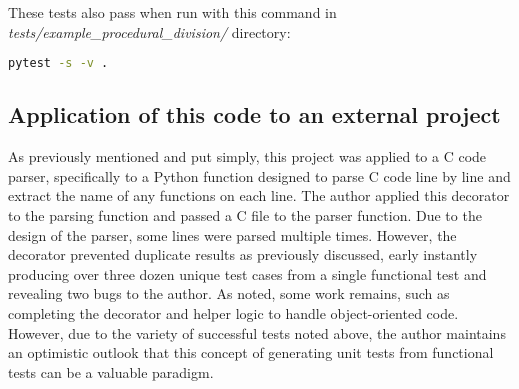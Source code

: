 These tests also pass when run with this command in 
\linebreak
\textit{tests/example\_procedural\_division/} directory:
\begin{lstlisting}[language=bash, caption={Running all generated unit
   tests for the division example}]
    pytest -s -v .
\end{lstlisting}

\subsection{Application of this code to an external project}\label{sec:eval-2}
As previously mentioned and put simply, this project was applied to a C code parser, 
specifically to a Python function designed to parse C code line by line
and extract the name of any functions on each line.  The author applied this
decorator to the parsing function and passed a C file to the parser function.
%
Due to the design of the parser, some lines were parsed multiple times.  
However, the decorator prevented duplicate results as previously discussed, 
early instantly producing over three dozen unique test cases 
from a single functional test and revealing two bugs to the author.
%
As noted, some work remains, such as completing the decorator and helper logic
to handle object-oriented code.  However, due to the variety of successful 
tests noted above, the author maintains an optimistic outlook that this concept
of generating unit tests from functional tests can be a valuable paradigm.

